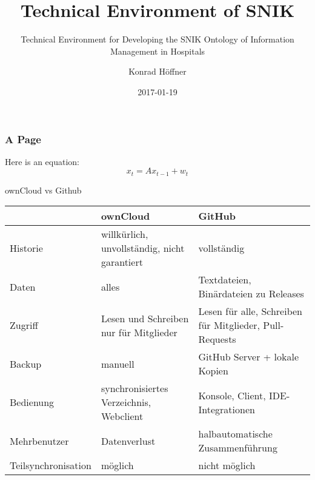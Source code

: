 \documentclass{beamer}
\author{Konrad Höffner}
\date{2017-01-19}
\title{Technical Environment of SNIK}
\subtitle{Technical Environment for Developing the SNIK Ontology of Information Management in Hospitals}
\begin{document}
\begin{frame}
\titlepage
\end{frame}

\begin{frame}[fragile]
\frametitle{A Page}
Here is an equation:
\begin{equation}
x_t = Ax_{t-1} + w_t
\end{equation}
\end{frame}

\begin{frame}{ownCloud vs Github}
\begin{tabulary}{\textwidth}{lLL}
\toprule
			&ownCloud					&GitHub\\
\midrule
Historie		&willkürlich, unvollständig, nicht garantiert	&vollständig\\
Daten			&alles						&Textdateien, Binärdateien zu Releases\\
Zugriff			&Lesen und Schreiben nur für Mitglieder		&Lesen für alle, Schreiben für Mitglieder, Pull-Requests\\
Backup			&manuell					&GitHub Server + lokale Kopien\\
Bedienung		&synchronisiertes Verzeichnis, Webclient	&Konsole, Client, IDE-Integrationen\\
Mehrbenutzer		&Datenverlust					&halbautomatische Zusammenführung\\
Teilsynchronisation	&möglich					&nicht möglich\\
\bottomrule
\end{tabulary}
\end{frame}
 
 
 
 
\end{document}
